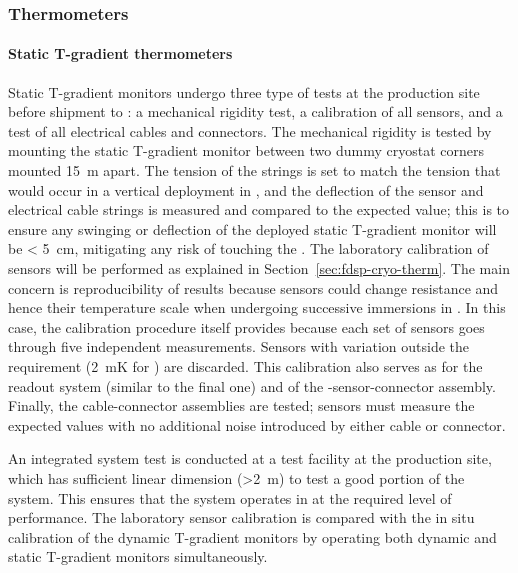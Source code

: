 \subsubsection{Thermometers}
\label{sec:fdgen-slow-cryo-qc-th}

\paragraph{Static T-gradient thermometers}
\label{sec:fdgen-slow-cryo-qc-thst}

Static T-gradient monitors undergo three type of tests at the production site before %
shipment to : a mechanical rigidity test, a calibration of all sensors, and a test of all electrical cables and connectors.
The mechanical rigidity is tested by mounting the static T-gradient monitor between two dummy cryostat corners mounted \SI{15}{m} apart. The tension of the strings is set to match the tension that would occur in a vertical deployment in , and the deflection of the sensor and electrical cable strings is measured and compared to the expected value; this is to ensure any swinging or deflection of the deployed static T-gradient monitor will be < \SI{5}{cm}, mitigating any risk of touching the .
The laboratory calibration of sensors will be performed 
as explained in Section~\ref{sec:fdsp-cryo-therm}. The main concern is reproducibility of results because sensors could change resistance and hence their temperature scale when undergoing successive immersions in . In this case, the calibration procedure itself provides  because each set of sensors goes through five independent measurements. Sensors with \rms variation outside the requirement (\SI{2}{mK} for ) are discarded. This calibration also serves as  for the readout system (similar to the final one) and of the -sensor-connector assembly.
Finally, the cable-connector assemblies are tested; sensors must measure the expected values with no additional noise introduced by either cable or connector. 

An integrated system test is conducted at a  test facility at the production site, which has sufficient linear dimension (>\SI{2}{m}) to test a good portion of the system. This %
ensures that  the system
operates in  at the required level of performance.
The laboratory sensor calibration %
is compared with the in situ calibration
of the dynamic T-gradient monitors by operating both dynamic and static T-gradient monitors simultaneously.   

